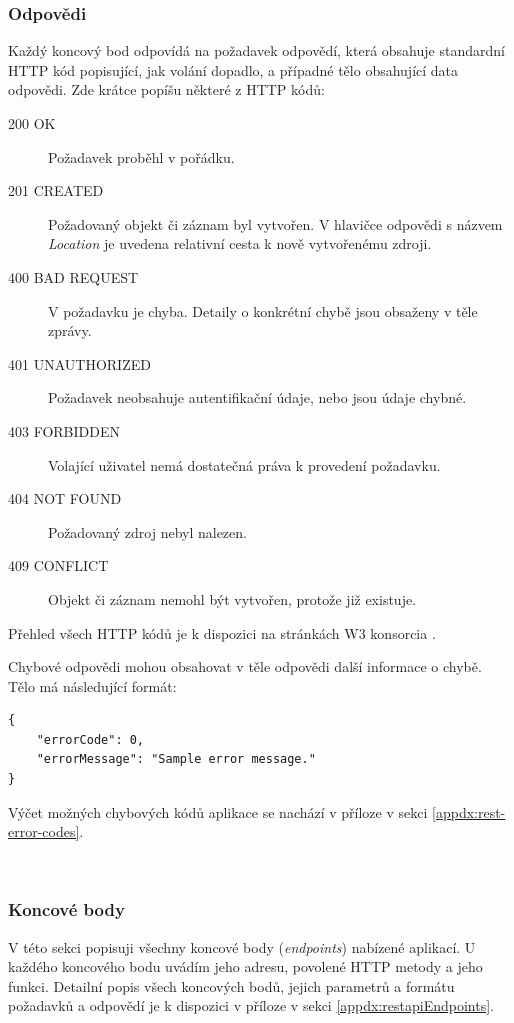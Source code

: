 \documentclass[thesis=B,czech]{FITthesis}[2012/06/26]
\begin{document}
			\subsubsection{Odpovědi}
			\label{sec:responses}
			Každý koncový bod odpovídá na požadavek odpovědí, která obsahuje standardní HTTP kód popisující, jak volání dopadlo, a případné tělo obsahující data odpovědi. Zde krátce popíšu některé z HTTP kódů:
			\begin{description}
				\item[200 OK] Požadavek proběhl v pořádku.
				\item[201 CREATED] Požadovaný objekt či záznam byl vytvořen. V hlavičce odpovědi s názvem \textit{Location} je uvedena relativní cesta k nově vytvořenému zdroji.
				\item[400 BAD REQUEST] V požadavku je chyba. Detaily o konkrétní chybě jsou obsaženy v těle zprávy.
				\item[401 UNAUTHORIZED] Požadavek neobsahuje autentifikační údaje, nebo jsou údaje chybné.
				\item[403 FORBIDDEN] Volající uživatel nemá dostatečná práva k provedení požadavku.
				\item[404 NOT FOUND] Požadovaný zdroj nebyl nalezen.
				\item[409 CONFLICT] Objekt či záznam nemohl být vytvořen, protože již existuje.
			\end{description}
			Přehled všech HTTP kódů je k dispozici na stránkách W3 konsorcia \cite{http-codes-w3}.
			
			Chybové odpovědi mohou obsahovat v těle odpovědi další informace o chybě. Tělo má následující formát:
				\begin{Verbatim}[obeytabs,tabsize=2]
{
	"errorCode": 0,
	"errorMessage": "Sample error message."
}
				\end{Verbatim}
				Výčet možných chybových kódů aplikace se nachází v příloze v sekci \ref{appdx:rest-error-codes}.
			
			\hfill \\
			
			
			\subsubsection{Koncové body}
			\label{sec:rest-api}
			V této sekci popisuji všechny koncové body (\textit{endpoints}) nabízené aplikací. U každého koncového bodu uvádím jeho adresu, povolené HTTP metody a jeho funkci. Detailní popis všech koncových bodů, jejich parametrů a formátu požadavků a odpovědí je k dispozici v příloze v sekci \ref{appdx:restapiEndpoints}.
			
\end{document}
